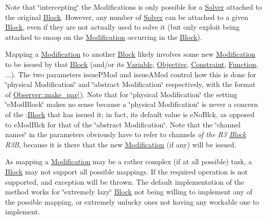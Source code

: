 Note that \char`\"{}intercepting\char`\"{} the Modifications is only possible for a \mbox{\hyperlink{class_s_m_spp__di__unipi__it_1_1_solver}{Solver}} attached to the original \mbox{\hyperlink{class_s_m_spp__di__unipi__it_1_1_block}{Block}}. However, any number of \mbox{\hyperlink{class_s_m_spp__di__unipi__it_1_1_solver}{Solver}} can be attached to a given \mbox{\hyperlink{class_s_m_spp__di__unipi__it_1_1_block}{Block}}, even if they are not actually used to solve it (but only exploit being attached to snoop on the \mbox{\hyperlink{class_s_m_spp__di__unipi__it_1_1_modification}{Modification}} occurring in the \mbox{\hyperlink{class_s_m_spp__di__unipi__it_1_1_block}{Block}}).

Mapping a \mbox{\hyperlink{class_s_m_spp__di__unipi__it_1_1_modification}{Modification}} to another \mbox{\hyperlink{class_s_m_spp__di__unipi__it_1_1_block}{Block}} likely involves some new \mbox{\hyperlink{class_s_m_spp__di__unipi__it_1_1_modification}{Modification}} to be issued by that \mbox{\hyperlink{class_s_m_spp__di__unipi__it_1_1_block}{Block}} (and/or its \mbox{\hyperlink{class_s_m_spp__di__unipi__it_1_1_variable}{Variable}}, \mbox{\hyperlink{class_s_m_spp__di__unipi__it_1_1_objective}{Objective}}, \mbox{\hyperlink{class_s_m_spp__di__unipi__it_1_1_constraint}{Constraint}}, \mbox{\hyperlink{class_s_m_spp__di__unipi__it_1_1_function}{Function}}, ...). The two parameters issue\+P\+Mod and issue\+A\+Mod control how this is done for \char`\"{}physical Modification\char`\"{} and \char`\"{}abstract
\+Modification\char`\"{} respectively, with the format of \mbox{\hyperlink{class_s_m_spp__di__unipi__it_1_1_observer_a2d499ae38e5e95cf66cd71da32b0694a}{Observer\+::make\+\_\+par()}}. Note that for \char`\"{}physical Modification\char`\"{} the setting \char`\"{}e\+Mod\+Block\char`\"{} makes no sense because a \char`\"{}physical Modification\char`\"{} is never a concern of the \+:\mbox{\hyperlink{class_s_m_spp__di__unipi__it_1_1_block}{Block}} that has issued it; in fact, its default value is e\+No\+Blck, as opposed to e\+Mod\+Blck for that of the \char`\"{}abstract Modification\char`\"{}. Note that the \char`\"{}channel
names\char`\"{} in the parameters obviously have to refer to channels {\itshape of the R3 \mbox{\hyperlink{class_s_m_spp__di__unipi__it_1_1_block}{Block}} R3B}, because it is there that the new \mbox{\hyperlink{class_s_m_spp__di__unipi__it_1_1_modification}{Modification}} (if any) will be issued.

As mapping a \mbox{\hyperlink{class_s_m_spp__di__unipi__it_1_1_modification}{Modification}} may be a rather complex (if at all possible) task, a \mbox{\hyperlink{class_s_m_spp__di__unipi__it_1_1_block}{Block}} may not support all possible mappings. If the required operation is not supported, and exception will be thrown. The default implementation of the method works for \char`\"{}extremely lazy\char`\"{} \mbox{\hyperlink{class_s_m_spp__di__unipi__it_1_1_block}{Block}} not being willing to implement any of the possible mapping, or extremely unlucky ones not having any workable one to implement. 

